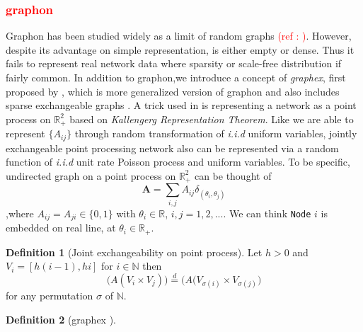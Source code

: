 \documentclass[12pt]{article}
\theoremstyle{definition}
\newtheorem{definition}{Definition}[section]
\begin{document}
	
\subsubsection{\textcolor{red}{graphon}}
	
Graphon has been studied widely as a limit of random graphs \textcolor{red}{(ref : )}. However, despite its advantage on simple representation, is either empty or dense. Thus it fails to represent real network data where sparsity or scale-free distribution if fairly common. In addition to graphon,we introduce a concept of \textit{graphex}, first proposed by \cite{veitch2015class}, which is more generalized version of graphon and also includes sparse exchangeable graphs \cite{caron2014sparse}. A trick used in \cite{caron2014sparse} is representing a network as a point process on $\mathbb{R}^2_{+}$ based on \textit{Kallengerg Representation Theorem}\cite{kallenberg1990exchangeable}. Like we are able to represent $\{ A_{ij} \}$ through random transformation of \textit{i.i.d} uniform variables, jointly exchangeable point processing network also can be represented via a random function of \textit{i.i.d} unit rate Poisson process and uniform variables. 
	To be specific, undirected graph on a point process on $\mathbb{R}^2_{+}$ can be thought of 
	\begin{equation}
	\mathbf{A} = \sum\limits_{i,j} A_{ij} \delta_{( \theta_{i}, \theta_{j})} 
	\end{equation}	
	,where $A_{ij} = A_{ji} \in \{ 0 , 1  \}$ with $\theta_{i} \in \mathbb{R}$, $i,j = 1,2,...$. We can think \texttt{Node} $i$ is embedded on real line, at $\theta_{i} \in \mathbb{R}_{+}$. 	
	
	
	\begin{definition}[Joint exchangeability on point process]
		\label{point}
		Let $h > 0$ and  $V_{i} = [h(i-1), hi ]$ for $i \in \mathbb{N}$ then
		\begin{equation}
		\big( A( V_{i} \times V_{j}  )   \big)  \stackrel{d}{=} \big( A( V_{\sigma(i)} \times V_{\sigma(j)}     \big)
		\end{equation}	
		for any permutation $\sigma$ of $\mathbb{N}$.		
	\end{definition}
	
	
	
	\begin{definition}[graphex \cite{kallenberg1990exchangeable}]
		\label{graphex}
		
		
	\end{definition}
	
\end{document}
